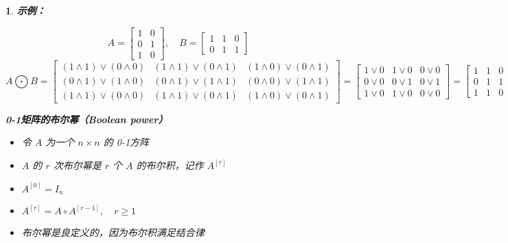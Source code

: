 \documentclass[UTF8]{report}
\theoremstyle{MyLineTheoremStyle} %
\theoremstyle{MyBlockTheoremStyle} %
\theoremstyle{MySubsubsectionStyle} %
\newtheorem{definition}{}
\begin{document}
\begin{definition}
        \textbf{示例：}\par
        \[
        A =
        \begin{bmatrix}
        1 & 0 \\
        0 & 1 \\
        1 & 0
        \end{bmatrix}
        , \quad
        B =
        \begin{bmatrix}
        1 & 1 & 0 \\
        0 & 1 & 1
        \end{bmatrix}
        \]
        \[
        A \bigodot  B =
        \begin{bmatrix}
        (1 \land 1) \lor (0 \land 0) & (1 \land 1) \lor (0 \land 1) & (1 \land 0) \lor (0 \land 1) \\
        (0 \land 1) \lor (1 \land 0) & (0 \land 1) \lor (1 \land 1) & (0 \land 0) \lor (1 \land 1) \\
        (1 \land 1) \lor (0 \land 0) & (1 \land 1) \lor (0 \land 1) & (1 \land 0) \lor (0 \land 1)
        \end{bmatrix}
        =
        \begin{bmatrix}
        1 \lor 0 & 1 \lor 0 & 0 \lor 0 \\
        0 \lor 0 & 0 \lor 1 & 0 \lor 1 \\
        1 \lor 0 & 1 \lor 0 & 0 \lor 0
        \end{bmatrix}
        =
        \begin{bmatrix}
            1 & 1 & 0 \\
            0 & 1 & 1 \\
            1 & 1 & 0
            \end{bmatrix}
            \]

 \textbf{0-1矩阵的布尔幂（Boolean power）}\par
    \begin{itemize}
        \item 令 $A$ 为一个 $n \times n$ 的 0-1方阵
        \item $A$ 的 $r$ 次布尔幂是 $r$ 个 $A$ 的布尔积，记作 $A^{[r]}$
        \item $A^{[0]} = I_n$
        \item $A^{[r]} = A \circ A^{[r-1]}, \quad r \geq 1$
        \item 布尔幂是良定义的，因为布尔积满足结合律
    \end{itemize}


\end{definition}
\end{document}

